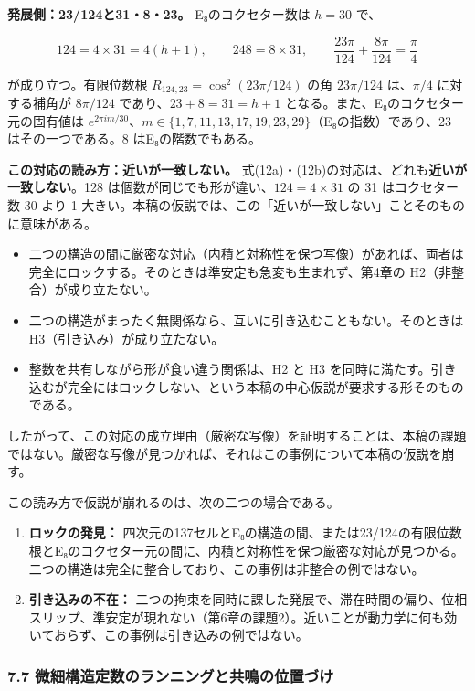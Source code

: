 \documentclass[
  a4paper,
]{ltjsarticle}
\providecommand{\tightlist}{%
  \setlength{\itemsep}{0pt}\setlength{\parskip}{0pt}}
\begin{document}
\textbf{発展側：23/124と31・8・23。} E₈のコクセター数は \(h=30\) で、

\[
124=4\times31=4(h+1),\qquad 248=8\times31,\qquad \frac{23\pi}{124}+\frac{8\pi}{124}=\frac{\pi}{4}
\tag{12b}
\]

が成り立つ。有限位数根 \(R_{124,23}=\cos^2(23\pi/124)\) の角
\(23\pi/124\) は、\(\pi/4\) に対する補角が \(8\pi/124\)
であり、\(23+8=31=h+1\) となる。また、E₈のコクセター元の固有値は
\(e^{2\pi i m/30}\)、\(m\in\{1,7,11,13,17,19,23,29\}\)（E₈の指数）であり、23
はその一つである。8 はE₈の階数でもある。

\textbf{この対応の読み方：近いが一致しない。}
式(12a)・(12b)の対応は、どれも\textbf{近いが一致しない}。128
は個数が同じでも形が違い、\(124=4\times31\) の 31 はコクセター数 30 より
1
大きい。本稿の仮説では、この「近いが一致しない」ことそのものに意味がある。

\begin{itemize}
\tightlist
\item
  二つの構造の間に厳密な対応（内積と対称性を保つ写像）があれば、両者は完全にロックする。そのときは準安定も急変も生まれず、第4章の
  H2（非整合）が成り立たない。
\item
  二つの構造がまったく無関係なら、互いに引き込むこともない。そのときは
  H3（引き込み）が成り立たない。
\item
  整数を共有しながら形が食い違う関係は、H2 と H3
  を同時に満たす。引き込むが完全にはロックしない、という本稿の中心仮説が要求する形そのものである。
\end{itemize}

したがって、この対応の成立理由（厳密な写像）を証明することは、本稿の課題ではない。厳密な写像が見つかれば、それはこの事例について本稿の仮説を崩す。

この読み方で仮説が崩れるのは、次の二つの場合である。

\begin{enumerate}
\def\labelenumi{\arabic{enumi}.}
\tightlist
\item
  \textbf{ロックの発見：}
  四次元の137セルとE₈の構造の間、または23/124の有限位数根とE₈のコクセター元の間に、内積と対称性を保つ厳密な対応が見つかる。二つの構造は完全に整合しており、この事例は非整合の例ではない。
\item
  \textbf{引き込みの不在：}
  二つの拘束を同時に課した発展で、滞在時間の偏り、位相スリップ、準安定が現れない（第6章の課題2）。近いことが動力学に何も効いておらず、この事例は引き込みの例ではない。
\end{enumerate}

\subsubsection{7.7
微細構造定数のランニングと共鳴の位置づけ}\label{ux5faeux7d30ux69cbux9020ux5b9aux6570ux306eux30e9ux30f3ux30cbux30f3ux30b0ux3068ux5171ux9cf4ux306eux4f4dux7f6eux3065ux3051}
\end{document}
